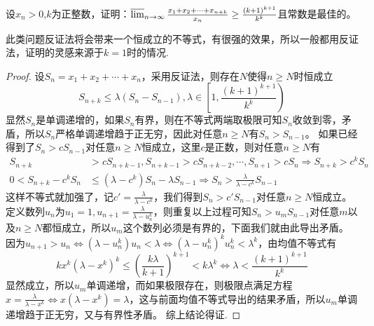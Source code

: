 \documentclass[lang=cn,newtx,10pt,scheme=chinese]{elegantbook}
\begin{document}
\begin{example}
设\(x_n>0\),\(k\)为正整数，证明：\(\varlimsup_{n\rightarrow\infty}\frac{x_1 + x_2+\cdots + x_{n + k}}{x_n}\geq\frac{(k + 1)^{k + 1}}{k^k}\)且常数是最佳的。
\end{example}
\begin{note}
此类问题反证法将会带来一个恒成立的不等式，有很强的效果，所以一般都用反证法，证明的灵感来源于\(k = 1\)时的情况.
\end{note}
\begin{proof}
设\(S_n=x_1 + x_2+\cdots + x_n\)，采用反证法，则存在\(N\)使得\(n\geq N\)时恒成立
\[S_{n + k}\leq\lambda(S_n - S_{n - 1}),\lambda\in\left[1,\frac{(k + 1)^{k + 1}}{k^k}\right)\]
显然\(S_n\)是单调递增的，如果\(S_n\)有界，则在不等式两端取极限可知\(S_n\)收敛到零，矛盾，所以\(S_n\)严格单调递增趋于正无穷，因此对任意\(n\geq N\)有\(S_n>S_{n - 1}\)。
如果已经得到了\(S_n>cS_{n - 1}\)对任意\(n\geq N\)恒成立，这里\(c\)是正数，则对任意\(n\geq N\)有
\begin{align*}
S_{n + k}&>cS_{n + k - 1},S_{n + k - 1}>cS_{n + k - 2},\cdots,S_{n + 1}>cS_n\Rightarrow S_{n + k}>c^kS_n\\
0<S_{n + k}-c^kS_n&\leq(\lambda - c^k)S_n-\lambda S_{n - 1}\Rightarrow S_n>\frac{\lambda}{\lambda - c^k}S_{n - 1}
\end{align*}
这样不等式就加强了，记\(c'=\frac{\lambda}{\lambda - c^k}\)，我们得到\(S_n>c'S_{n - 1}\)对任意\(n\geq N\)恒成立。
定义数列\(u_n\)为\(u_1 = 1,u_{n + 1}=\frac{\lambda}{\lambda - u_n^k}\)，则重复以上过程可知\(S_n>u_mS_{n - 1}\)对任意\(m\)以及\(n\geq N\)都恒成立，所以\(u_m\)这个数列必须是有界的，下面我们就由此导出矛盾。
因为\(u_{n + 1}>u_n\Leftrightarrow(\lambda - u_n^k)u_n<\lambda\Leftrightarrow(\lambda - u_n^k)^ku_n^k<\lambda^k\)，由均值不等式有
\[kx^k(\lambda - x^k)^k\leq\left(\frac{k\lambda}{k + 1}\right)^{k + 1}<k\lambda^k\Leftrightarrow\lambda<\frac{(k + 1)^{k + 1}}{k^k}\]
显然成立，所以\(u_m\)单调递增，而如果极限存在，则极限点满足方程\(x=\frac{\lambda}{\lambda - x^k}\Leftrightarrow x(\lambda - x^k)=\lambda\)，这与前面均值不等式导出的结果矛盾，所以\(u_m\)单调递增趋于正无穷，又与有界性矛盾。
综上结论得证.
\end{proof}
\end{document}
